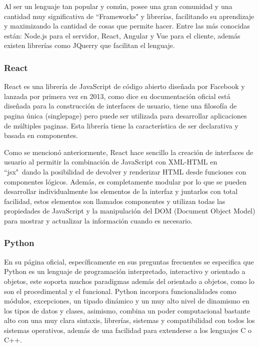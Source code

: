 Al ser un lenguaje tan popular y común, posee una gran comunidad y una cantidad
muy significativa de ``Frameworks"  y librerías, facilitando su aprendizaje
y maximizando la cantidad de cosas que permite hacer. Entre las más conocidas
están: Node.js para el servidor, React, Angular y Vue para el cliente, además
existen librerías como JQuerry que facilitan el lenguaje.

\subsubsection{React}

React es una librería de JavaScript de código abierto diseñada por Facebook y
lanzada por primera vez en 2013, como dice su documentación oficial \cite{React}
está diseñada para la construcción de interfaces de usuario, tiene una filosofía
de pagina única (singlepage) pero puede ser utilizada para desarrollar aplicaciones
de múltiples paginas. Esta librería tiene la característica de ser declarativa
y basada en componentes.

Como se mencionó anteriormente, React hace sencillo la creación de interfaces
de usuario al permitir la combinación de JavaScript con XML-HTML en ``jsx"\  dando
la posibilidad de devolver y renderizar HTML desde funciones con componentes
lógicos. Además, es completamente modular por lo que se pueden desarrollar
individualmente los elementos de la interfaz y juntarlos con total facilidad,
estos elementos son llamados componentes y utilizan todas las propiedades de
JavaScript y la manipulación del DOM (Document Object Model) para mostrar
y actualizar la información cuando es necesario.


\subsubsection{Python}

En su página oficial, específicamente en sus preguntas frecuentes
\cite{pythonDocs} se especifica que Python es un lenguaje de programación
interpretado, interactivo y orientado a objetos, este soporta muchos paradigmas
además del orientado a objetos, como lo son el procedimental y el funcional.
Python incorpora funcionalidades como módulos, excepciones, un tipado dinámico
y un muy alto nivel de dinamismo en los tipos de datos y clases, asimismo,
combina un poder computacional bastante alto con una muy clara sintaxis,
librerías, sistemas y compatibilidad con todos los sistemas operativos, además
de una facilidad para extenderse a los lenguajes C o C++.

